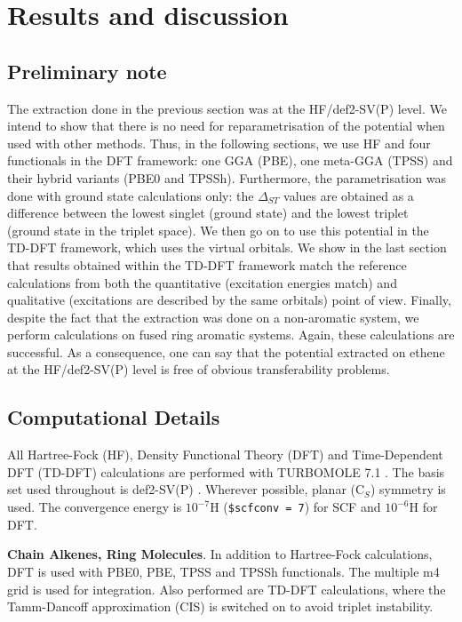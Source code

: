\documentclass[aip]{revtex4-1}
\begin{document}
\section{Results and discussion}

\subsection{Preliminary note}
The extraction done in the previous section was at the HF/def2-SV(P) level.
We intend to show that there is no need for reparametrisation of the potential
when used with other methods.
Thus, in the following sections, we use HF and four functionals in the DFT framework:
one GGA (PBE), one meta-GGA (TPSS) and their hybrid variants (PBE0 and TPSSh).
Furthermore, the parametrisation was done with ground state calculations only:
the $\Delta_{ST}$ values are obtained as a difference between the lowest singlet (ground state)
and the lowest triplet (ground state in the triplet space).
We then go on to use this potential in the TD-DFT framework, which uses the virtual orbitals.
We show in the last section that results obtained within the TD-DFT framework
match the reference calculations from both the quantitative (excitation energies match)
and qualitative (excitations are described by the same orbitals) point of view.
Finally, despite the fact that the extraction was done on a non-aromatic system,
we perform calculations on fused ring aromatic systems.
Again, these calculations are successful.
As a consequence, one can say that the potential extracted on ethene at the HF/def2-SV(P)
level is free of obvious transferability problems.

\subsection{Computational Details}
All Hartree-Fock (HF), Density Functional Theory (DFT) and Time-Dependent DFT (TD-DFT) calculations
are performed with TURBOMOLE 7.1 \cite{TURBOMOLE}.
The basis set used throughout is def2-SV(P) \cite{defsvp}.
Wherever possible, planar (C\(_{S}\)) symmetry is used.
The convergence energy is \(10^{-7}\)H (\texttt{\$scfconv = 7}) for SCF and \(10^{-6}\)H for DFT.

\textbf{Chain Alkenes, Ring Molecules}. In addition to Hartree-Fock calculations, DFT is used with PBE0, PBE, TPSS and TPSSh functionals. \cite{pbe0,pbe,tpss,tpssh} The multiple m4 grid is used for integration. Also performed are TD-DFT calculations, where the Tamm-Dancoff approximation (CIS) \cite{tammdancoff} is switched on to avoid triplet instability.
\end{document}
